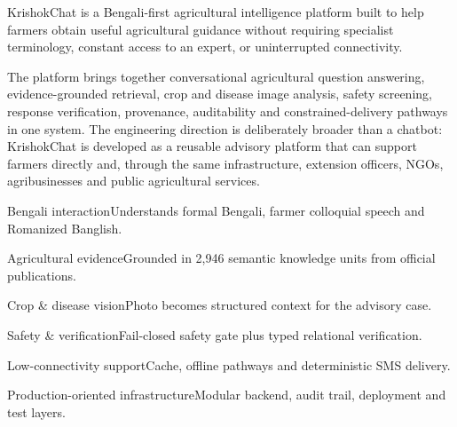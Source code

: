 \documentclass[11pt,a4paper]{article}
\begin{document}
\begin{minipage}[t]{0.50\linewidth}
KrishokChat is a Bengali-first agricultural intelligence platform built to help
farmers obtain useful agricultural guidance without requiring specialist
terminology, constant access to an expert, or uninterrupted connectivity.

\vspace{4pt}
The platform brings together conversational agricultural question answering,
evidence-grounded retrieval, crop and disease image analysis, safety screening,
response verification, provenance, auditability and constrained-delivery pathways
in one system. The engineering direction is deliberately broader than a chatbot:
KrishokChat is developed as a reusable advisory platform that can support farmers
directly and, through the same infrastructure, extension officers, NGOs,
agribusinesses and public agricultural services.
\end{minipage}\hfill
\begin{minipage}[t]{0.46\linewidth}
\vspace{-2pt}
\begin{card}{Bengali interaction}\footnotesize Understands formal Bengali, farmer colloquial speech and Romanized Banglish.\end{card}\vspace{3pt}
\begin{card}{Agricultural evidence}\footnotesize Grounded in 2,946 semantic knowledge units from official publications.\end{card}\vspace{3pt}
\begin{card}{Crop \& disease vision}\footnotesize Photo becomes structured context for the advisory case.\end{card}\vspace{3pt}
\begin{card}{Safety \& verification}\footnotesize Fail-closed safety gate plus typed relational verification.\end{card}\vspace{3pt}
\begin{card}{Low-connectivity support}\footnotesize Cache, offline pathways and deterministic SMS delivery.\end{card}\vspace{3pt}
\begin{card}{Production-oriented infrastructure}\footnotesize Modular backend, audit trail, deployment and test layers.\end{card}
\end{minipage}
\end{document}

